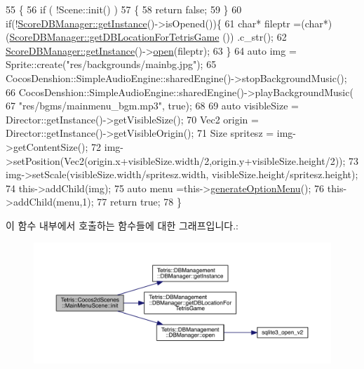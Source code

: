 \begin{DoxyCode}
55                        \{
56          \textcolor{keywordflow}{if} ( !Scene::init() )
57     \{
58         \textcolor{keywordflow}{return} \textcolor{keyword}{false};
59     \}
60         \textcolor{keywordflow}{if}(!\hyperlink{class_tetris_1_1_d_b_management_1_1_d_b_manager_a9cb81505055490211a9b5c79c3c22c18}{ScoreDBManager::getInstance}()->isOpened())\{
61             \textcolor{keywordtype}{char}* fileptr =(\textcolor{keywordtype}{char}*) (\hyperlink{class_tetris_1_1_d_b_management_1_1_d_b_manager_ae50cfd222e276a5ca27e17c886aa5dd5}{ScoreDBManager::getDBLocationForTetrisGame}
      ()) .c\_str();
62             \hyperlink{class_tetris_1_1_d_b_management_1_1_d_b_manager_a9cb81505055490211a9b5c79c3c22c18}{ScoreDBManager::getInstance}()->\hyperlink{class_tetris_1_1_d_b_management_1_1_d_b_manager_a8bf7e756a9cca7e57fef00076fb62f36}{open}(fileptr);
63         \}
64         \textcolor{keyword}{auto} img = Sprite::create(\textcolor{stringliteral}{"res/backgrounds/mainbg.jpg"});
65         CocosDenshion::SimpleAudioEngine::sharedEngine()->stopBackgroundMusic();
66         CocosDenshion::SimpleAudioEngine::sharedEngine()->playBackgroundMusic(
67                                                                               \textcolor{stringliteral}{"res/bgms/mainmenu\_bgm.mp3"}, \textcolor{keyword}{
      true});
68         
69         \textcolor{keyword}{auto} visibleSize = Director::getInstance()->getVisibleSize();
70         Vec2 origin = Director::getInstance()->getVisibleOrigin();
71         Size spritesz = img->getContentSize();
72         img->setPosition(Vec2(origin.x+visibleSize.width/2,origin.y+visibleSize.height/2));
73         img->setScale(visibleSize.width/spritesz.width, visibleSize.height/spritesz.height);
74         this->addChild(img);
75         \textcolor{keyword}{auto} menu =this->\hyperlink{class_tetris_1_1_cocos2d_scenes_1_1_main_menu_scene_a1d29d6f4c75637e30b6a7621b3c74ac7}{generateOptionMenu}();
76         this->addChild(menu,1);
77         \textcolor{keywordflow}{return} \textcolor{keyword}{true};
78     \}
\end{DoxyCode}
이 함수 내부에서 호출하는 함수들에 대한 그래프입니다.\+:
\nopagebreak
\begin{figure}[H]
\begin{center}
\leavevmode
\includegraphics[width=350pt]{dc/d34/class_tetris_1_1_cocos2d_scenes_1_1_main_menu_scene_ae4d89ddd3650f5f24e86ea631092ecb9_cgraph}
\end{center}
\end{figure}
